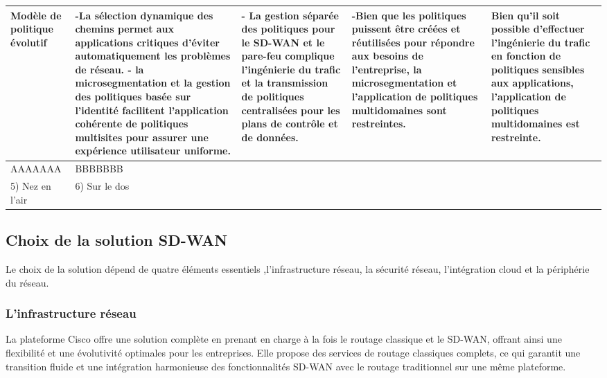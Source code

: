 		\begin{table}[H]
			\begin{center}
			
	\hspace*{-0.5 cm}	\begin{tabular}{|p{3cm}|p{3cm}|p{3cm}|p{3cm}|p{3cm}|}
	\hline
	\centering
		\centering
		Modèle de politique évolutif & -La sélection dynamique des chemins permet aux applications critiques d'éviter automatiquement les problèmes de réseau.
		- la microsegmentation et la gestion des politiques basée sur l'identité facilitent l'application cohérente de politiques multisites pour assurer une expérience utilisateur uniforme.& - La gestion séparée des politiques pour le SD-WAN et le pare-feu complique l'ingénierie du trafic et la transmission de politiques centralisées pour les plans de contrôle et de données.& -Bien que les politiques puissent être créées et réutilisées pour répondre aux besoins de l'entreprise, la microsegmentation et l'application de politiques multidomaines sont restreintes.& Bien qu'il soit possible d'effectuer l'ingénierie du trafic en fonction de politiques sensibles aux applications, l'application de politiques multidomaines est restreinte.
		 \\
		\hline
		
		
		\centering
	AAAAAAA &BBBBBBB\\
		\hline
		\centering
		
		5) Nez en l’air &   6) Sur le dos \\
		\hline
	\end{tabular}
\end{center}
\end{table}	
 

\subsection{Choix de la solution SD-WAN  }
Le choix de la solution dépend de quatre éléments essentiels ,l'infrastructure réseau, la sécurité réseau, l'intégration cloud et la périphérie du réseau.
\subsubsection{L'infrastructure réseau }

La plateforme Cisco offre une solution complète en prenant en charge à la fois le routage classique et le SD-WAN, offrant ainsi une flexibilité et une évolutivité optimales pour les entreprises. Elle propose des services de routage classiques complets, ce qui garantit une transition fluide et une intégration harmonieuse des fonctionnalités SD-WAN avec le routage traditionnel sur une même plateforme. 


